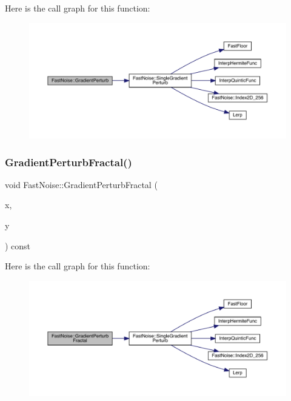 Here is the call graph for this function\+:
\nopagebreak
\begin{figure}[H]
\begin{center}
\leavevmode
\includegraphics[width=350pt]{class_fast_noise_a24007877680a6d0f45ea1d7f209ee6f1_cgraph}
\end{center}
\end{figure}
\mbox{\label{class_fast_noise_ab3d6570d2a46f693ef4c63f10ea872ca}} 
\subsubsection{\texorpdfstring{Gradient\+Perturb\+Fractal()}{GradientPerturbFractal()}\hspace{0.1cm}{\footnotesize\ttfamily [1/2]}}
{\footnotesize\ttfamily void Fast\+Noise\+::\+Gradient\+Perturb\+Fractal (\begin{DoxyParamCaption}\item[{\mbox{\hyperlink{_fast_noise_8h_a75a9ef6d2541c4921815b885bfd449c3}{F\+N\+\_\+\+D\+E\+C\+I\+M\+AL}} \&}]{x,  }\item[{\mbox{\hyperlink{_fast_noise_8h_a75a9ef6d2541c4921815b885bfd449c3}{F\+N\+\_\+\+D\+E\+C\+I\+M\+AL}} \&}]{y }\end{DoxyParamCaption}) const}

Here is the call graph for this function\+:
\nopagebreak
\begin{figure}[H]
\begin{center}
\leavevmode
\includegraphics[width=350pt]{class_fast_noise_ab3d6570d2a46f693ef4c63f10ea872ca_cgraph}
\end{center}
\end{figure}
\mbox{\label{class_fast_noise_a155a219f6356b75e3dfc2610d03e801a}} 

